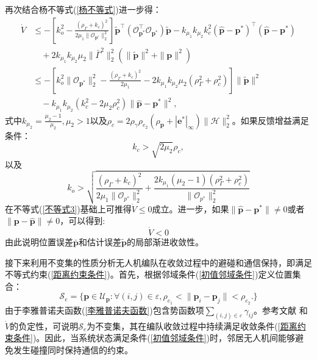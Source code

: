 再次结合杨不等式(\ref{杨不等式})进一步得：
\begin{align}
	\dot{V}
	&\leq -\left[ k_o^2 - \frac{(\rho_\Gamma + k_c)^2}{2\mu_1 \|\mathcal{O}_{\mathbf{p}^*}\|_2^2} \right]
	\tilde{\mathbf{p}}^\top (\mathcal{O}_{\mathbf{p}^*}^\top \mathcal{O}_{\mathbf{p}^*}) \tilde{\mathbf{p}}
	- k_{\mu_1} k_{\mu_2} k_c^2 (\hat{\mathbf{p}} - \mathbf{p}^*)^\top (\hat{\mathbf{p}} - \mathbf{p}^*) \nonumber \\
	&\quad + 2k_{\mu_1} k_{\mu_2} \mu_2 \|\bar{\Gamma}^2\|_2^2 \left( \|\tilde{\mathbf{p}}\|^2 + \|\mathbf{p}\|^2 \right) \nonumber \\
	&\leq -\left[ k_o^2 \|\mathcal{O}_{\mathbf{p}^*}\|_2^2 - \frac{(\rho_\Gamma + k_c)^2}{2\mu_1}
	- 2k_{\mu_1} k_{\mu_2} \mu_2 (\rho_\Gamma^2 + \rho_c^2) \right] \|\tilde{\mathbf{p}}\|^2 \nonumber \\
	&\quad - k_{\mu_1} k_{\mu_2} \left( k_c^2 - 2\mu_2 \rho_c^2 \right) \|\hat{\mathbf{p}} - \mathbf{p}^*\|^2,
	\label{不等式3}
\end{align}
式中$k_{\mu_2}=\frac{\mu_2-1}{\mu_2},\mu_2>1$以及$\rho_c=2\rho_\gamma\rho_{e_2}(\rho_\mathbf{p}+|\mathbf{e}^*|_\infty)\|\mathcal{H}\|^2_2$。如果反馈增益满足条件：
\begin{equation}
	k_c>\sqrt{2\mu_2}\rho_c,
	\label{控制反馈增益条件}
\end{equation}
以及
\begin{equation}
	k_o > \sqrt{ \frac{(\rho_\Gamma + k_c)^2}{2\mu_1 \|\mathcal{O}_{p^*}\|_2^2} + \frac{2k_{\mu_1}(\mu_2 - 1)(\rho_\Gamma^2 + \rho_c^2)}{\|\mathcal{O}_{p^*}\|_2^2} }
	\label{观测反馈增益条件}
\end{equation}
在不等式(\ref{不等式3})基础上可推得$\dot{V}\le0$成立。进一步，如果$\|\hat{\mathbf{p}}-\mathbf{p}^*\|\neq0$或者$\|\mathbf{p}-\hat{\mathbf{p}}\|\neq0$，可以得到:
\begin{equation}
	\dot{V}<0
\end{equation}
由此说明位置误差$\bar{\mathbf{p}}$和估计误差$\tilde{\mathbf{p}}$的局部渐进收敛性。

接下来利用不变集的性质分析无人机编队在收敛过程中的避碰和通信保持，即满足不等式约束(\ref{距离约束条件})。首先，根据邻域条件(\ref{初值邻域条件})定义位置集合：
\begin{equation}
	\mathcal{S}_e = \{
		\mathbf{p} \in \mathcal{U}_\mathbf{p} :
		\forall(i,j) \in \varepsilon,
		\rho_{e_1} < \|\mathbf{p}_i-\mathbf{p}_j\|< \rho_{e_2}.
	\}
\end{equation}
由于李雅普诺夫函数(\ref{李雅普诺夫函数})包含势函数项$\sum_{(i,j) \in \varepsilon} \gamma_{ij}$。参考文献\parencite{4739215} 和$\dot{V}$的负定性，可说明$\mathcal{S}_e$为不变集，其在编队收敛过程中持续满足收敛条件(\ref{距离约束条件})。因此，当系统状态满足条件(\ref{初值邻域条件})时，邻居无人机间能够避免发生碰撞同时保持通信的约束。
